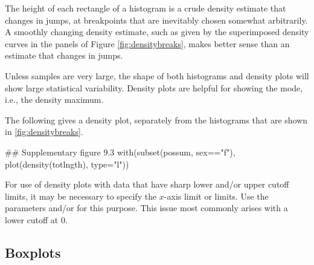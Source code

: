 The height of each rectangle of a histogram is a crude density
estimate that changes in jumps, at breakpoints that are
inevitably chosen somewhat arbitrarily.
A smoothly changing density estimate, such as given by the
superimposed density curves in the panels of Figure
\ref{fig:densitybreaks}, makes better sense than an estimate that
changes in jumps.

Unless samples are very large, the shape of both histograms and
density plots will show large statistical variability.  Density plots
are helpful for showing the mode, i.e., the density maximum.

The following gives a density plot, separately from the histograms that
are shown in \ref{fig:densitybreaks}.
\begin{Schunk}
\begin{Sinput}
## Supplementary figure 9.3
with(subset(possum, sex=="f"),
     plot(density(totlngth), type="l"))
\end{Sinput}
\end{Schunk}

For use of density plots with data that have sharp lower and/or upper
cutoff limits, it may be necessary to specify the $x$-axis limit or
limits. Use the
parameters  and/or  for this purpose. This issue
most commonly arises with a lower cutoff at 0.

\subsection*{Boxplots}

